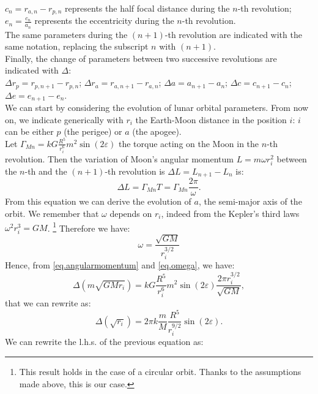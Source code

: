 \documentclass[11pt, oneside,reqno]{amsart}
\begin{document}
$c_n=r_{a,n}-r_{p,n}$ represents the half focal distance during the $n$-th revolution;\\
$e_n=\frac{c_n}{a_n}$ represents the eccentricity during the $n$-th revolution.\\
The same parameters during the $(n+1)$-th revolution are indicated with the same notation, replacing the subscript $n$ with $(n+1)$.\\
Finally, the change of parameters between two successive revolutions are indicated with $\Delta$:\\
$\Delta r_p = r_{p,n+1} - r_{p,n}$; $\Delta r_a = r_{a,n+1} - r_{a,n}$; $\Delta a = a_{n+1} - a_n$; $\Delta c = c_{n+1} - c_n$; $\Delta e = e_{n+1} - e_n$.\\
We can start by considering the evolution of lunar orbital parameters. From now on, we indicate generically with $r_i$ the Earth-Moon distance in the position $i$: $i$ can be either $p$ (the perigee) or $a$ (the apogee).\\
Let $\Gamma_{Mn} = k G \frac{R^5}{r_i^6} m^2 \sin(2\varepsilon)$ the torque acting on the Moon in the $n$-th revolution. Then the variation of Moon's angular momentum
$L=m \omega r_i^2$ between the $n$-th and the $(n+1)$-th revolution is $\Delta L = L_{n+1} - L_n$ is:
\begin{equation}\label{eq.angularmomentum}
    \Delta L = \Gamma_{Mn}  T = \Gamma_{Mn} \frac{2\pi}{\omega}. 
\end{equation}
From this equation we can derive the evolution of $a$, the semi-major axis of the orbit. We remember that $\omega$ depends on $r_i$, indeed from the Kepler's third laws $\omega^2 r_i^3 = GM$. \footnote{This result holds in the case of a circular orbit. Thanks to the assumptions made above, this is our case.} Therefore we have:
\begin{equation}\label{eq.omega}
    \omega=\frac{\sqrt{GM}}{r_i^{3/2}}
\end{equation}
Hence, from \eqref{eq.angularmomentum} and \eqref{eq.omega}, we have:
\begin{equation}\label{eq.evolution_a}
    \Delta\left(m \sqrt{GMr_i}\right) = k G \frac{R^5}{r_i^6} m^2 \sin(2\varepsilon)\frac{2\pi r_i^{3/2}}{\sqrt{GM}},
\end{equation}
that we can rewrite as:
\begin{equation}\label{eq.evolution_a1}
    \Delta\left(\sqrt{r_i}\right) = 2\pi k \frac{m}{M} \frac{R^5}{r_i^{9/2}} \sin(2\varepsilon).
\end{equation}
We can rewrite the l.h.s. of the previous equation as:
\end{document}
